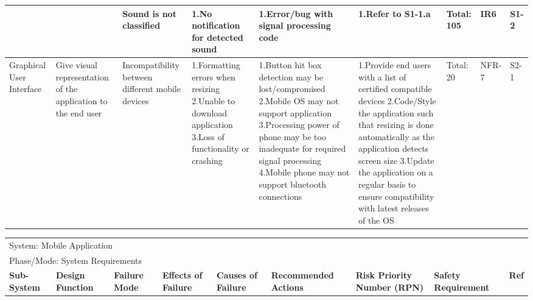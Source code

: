 \documentclass{article}
\begin{document}
\begin{landscape}
\begin{table}[H]
\begin{tabular}{| p{} | p{}  | p{} | p{} | p{} | p{} | p{} | p{} | p{} |}
     & & Sound is not classified & 1.No notification for detected sound & 1.Error/bug with signal processing code & 1.Refer to S1-1.a & Total: 105 & IR6 & S1-2 \\ \hline

    Graphical User Interface & Give visual representation of the application to the end user & Incompatibility between different mobile devices  & 1.Formatting errors when resizing \newline 2.Unable to download application \newline 3.Loss of functionality or crashing & 1.Button hit box detection may be lost/compromised \newline 2.Mobile OS may not support application \newline 3.Processing power of phone may be too  inadequate for required signal processing \newline 4.Mobile phone may not support bluetooth connections  & 1.Provide end users with a list of certified compatible devices \newline 2.Code/Style the application such that resizing is done automatically as the application detects screen size \newline 3.Update the application on a regular basis to ensure compatibility with latest releases of the OS  & Total: 20 & NFR-7 & S2-1 \\ \cline{1-9}

    \end{tabular}
\end{table}

\begin{table}[H]

    \centering
    \begin{tabular}{| p{} | p{}  | p{} | p{} | p{} | p{} | p{} | p{} | p{} |}
     \hline
    
    \multicolumn{9}{|l|}{System: Mobile Application } \\
    \multicolumn{9}{|l|}{Phase/Mode: System Requirements} \\ \hline
    \textbf{Sub-System} & \textbf{Design Function} & \textbf{Failure Mode} & \textbf{Effects of Failure} & \textbf{Causes of Failure} & \textbf{Recommended Actions} & \textbf{Risk Priority Number (RPN)} & \textbf{Safety Requirement} & \textbf{Ref} \\ \hline


\end{tabular}
\end{table}
\end{landscape}
\end{document}
